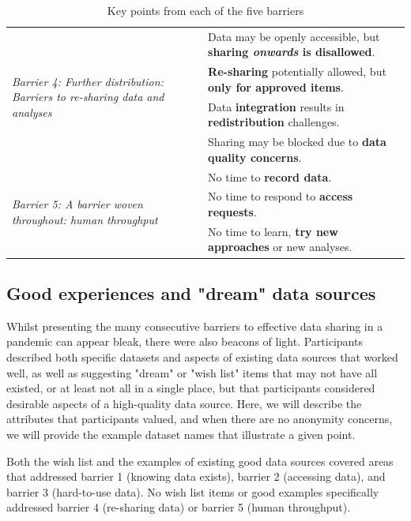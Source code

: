 \documentclass{CUP-JNL-DAP}%
\begin{document}
\begin{table}[ht!]
\begin{tabular}{ | l | l| }
         \hline
         
          \multirow{4}{10em}{\textit{Barrier 4: Further distribution: Barriers to re-sharing data and analyses}} 
         & Data may be openly accessible, but \textbf{sharing \textit{onwards} is disallowed}.\\
         & \textbf{Re-sharing} potentially allowed, but \textbf{only for approved items}. \\
         & Data \textbf{integration} results in \textbf{redistribution} challenges.\\
         & Sharing may be blocked due to \textbf{data quality concerns}. \\
         
         \hline
         \multirow{3}{10em}{\textit{Barrier 5: A barrier woven throughout: human throughput}} 
         & No time to \textbf{record data}. \\
         & No time to respond to \textbf{access requests}.\\
         & No time to learn, \textbf{try new approaches} or new analyses.\\
         \hline
    \end{tabular}
    \caption{Key points from each of the five barriers}
    \label{tab:barriers-summary}
\end{table}

\subsection{Good experiences and "dream" data sources}
Whilst presenting the many consecutive barriers to effective data sharing in a pandemic can appear bleak, there were also beacons of light. Participants described both specific datasets and aspects of existing data sources that worked well, as well as suggesting "dream" or "wish list" items that may not have all existed, or at least not all in a single place, but that participants considered desirable aspects of a high-quality data source. Here, we will describe the attributes that participants valued, and when there are no anonymity concerns, we will provide the example dataset names that illustrate a given point. 

Both the wish list and the examples of existing good data sources covered areas that addressed barrier 1 (knowing data exists), barrier 2 (accessing data), and barrier 3 (hard-to-use data). No wish list items or good examples specifically addressed barrier 4 (re-sharing data) or barrier 5 (human throughput). 
\end{document}
